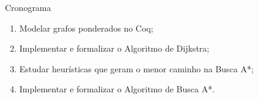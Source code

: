 \begin{frame}{Cronograma}
    \begin{enumerate}
        \item Modelar grafos ponderados no Coq;
        \item Implementar e formalizar o Algoritmo de Dijkstra;
        \item Estudar heurísticas que geram o menor caminho na Busca A*;
        \item Implementar e formalizar o Algoritmo de Busca A*.
    \end{enumerate}
\end{frame}